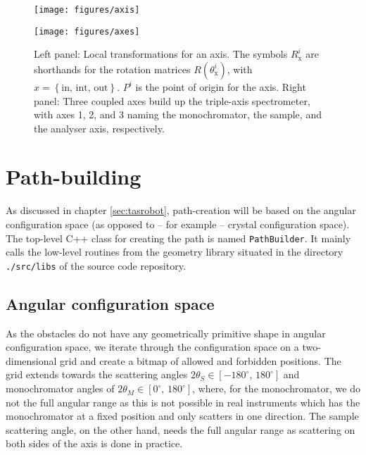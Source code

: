 \begin{figure*}
	\begin{minipage}{0.45 \textwidth}
		\begin{center}
			\texttt{[image: figures/axis]}
		\end{center}
	\end{minipage}
	\begin{minipage}{0.45 \textwidth}
		\begin{center}
			\texttt{[image: figures/axes]}
		\end{center}
	\end{minipage}
	\caption{Left panel: Local transformations for an axis. The symbols $R_{\mathrm{x}}^i$ are shorthands
	for the rotation matrices $R\left( \theta_{\mathrm{x}}^i \right)$, with $x = \left\{ \mathrm{in,\, int,\, out} \right\}$.
	$P^i$ is the point of origin for the axis.
	Right panel: Three coupled axes build up the triple-axis spectrometer, with axes 1, 2, and 3 naming the monochromator,
	the sample, and the analyser axis, respectively.
	\label{fig:tas_axes}}
\end{figure*}






\section{Path-building}
\label{sec:buildpath}

As discussed in chapter \ref{sec:tasrobot}, path-creation will be based on the angular configuration space
(as opposed to -- for example -- crystal configuration space). The top-level C++ class for creating the path
is named \lstinline[language=C++]|PathBuilder|. It mainly calls the low-level routines from the geometry
library situated in the directory \lstinline|./src/libs| of the source code repository.


\subsection{Angular configuration space}
As the obstacles do not have any geometrically primitive shape in angular configuration space, we iterate
through the configuration space on a two-dimensional grid and create a bitmap of allowed and forbidden
positions. The grid extends towards the scattering angles $2\theta_S \in \left[ -180^{\circ},\, 180^{\circ} \right]$ and monochromator angles of $2\theta_M \in \left[0^{\circ},\, 180^{\circ} \right]$, where, for the monochromator, we do
not the full angular range as this is not possible in real instruments which has the monochromator at a fixed position
and only scatters in one direction. The sample scattering angle, on the other hand, needs the full angular range as
scattering on both sides of the axis is done in practice.

